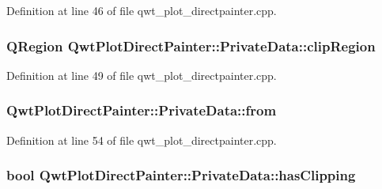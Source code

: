 Definition at line 46 of file qwt\-\_\-plot\-\_\-directpainter.\-cpp.

\hypertarget{class_qwt_plot_direct_painter_1_1_private_data_a77053766ff9e1ffa48e38ee5326cfce6}{
\subsubsection[{clip\-Region}]{\setlength{\rightskip}{0pt plus 5cm}Q\-Region Qwt\-Plot\-Direct\-Painter\-::\-Private\-Data\-::clip\-Region}}\label{class_qwt_plot_direct_painter_1_1_private_data_a77053766ff9e1ffa48e38ee5326cfce6}


Definition at line 49 of file qwt\-\_\-plot\-\_\-directpainter.\-cpp.

\hypertarget{class_qwt_plot_direct_painter_1_1_private_data_a9b94933522733ae1681562d32f69c668}{
\subsubsection[{from}]{ Qwt\-Plot\-Direct\-Painter\-::\-Private\-Data\-::from}}\label{class_qwt_plot_direct_painter_1_1_private_data_a9b94933522733ae1681562d32f69c668}


Definition at line 54 of file qwt\-\_\-plot\-\_\-directpainter.\-cpp.

\hypertarget{class_qwt_plot_direct_painter_1_1_private_data_ae0558f5fbe8f5a3f638c0d4fa54989e9}{
\subsubsection[{has\-Clipping}]{\setlength{\rightskip}{0pt plus 5cm}bool Qwt\-Plot\-Direct\-Painter\-::\-Private\-Data\-::has\-Clipping}}\label{class_qwt_plot_direct_painter_1_1_private_data_ae0558f5fbe8f5a3f638c0d4fa54989e9}


